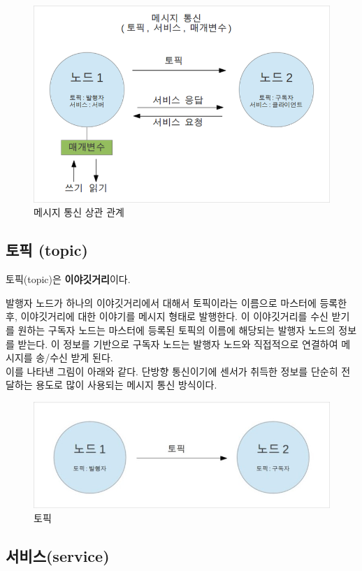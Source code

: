 \begin{figure}[h]
\centering\includegraphics[width=0.5\columnwidth]{pictures/chapter7/msgtrans1.png}
\caption{메시지 통신 상관 관계}
\end{figure}

\subsection{토픽 (topic)}

\begin{center} 
토픽(topic)은 \textbf{이야깃거리}이다.\\ 
\end{center}

발행자 노드가 하나의 이야깃거리에서 대해서 토픽이라는 이름으로 마스터에 등록한 후, 이야깃거리에 대한 이야기를 메시지 형태로 발행한다. 이 이야깃거리를 수신 받기를 원하는 구독자 노드는 마스터에 등록된 토픽의 이름에 해당되는 발행자 노드의 정보를 받는다. 이 정보를 기반으로 구독자 노드는 발행자 노드와 직접적으로 연결하여 메시지를 송/수신 받게 된다. \\

이를 나타낸 그림이 아래와 같다. 단방향 통신이기에 센서가 취득한 정보를 단순히 전달하는 용도로 많이 사용되는 메시지 통신 방식이다.

\begin{figure}[h]
\centering\includegraphics[width=0.7\columnwidth]{pictures/chapter7/msgtrans2.jpg}
\caption{토픽}
\end{figure}

\subsection{서비스(service)}

